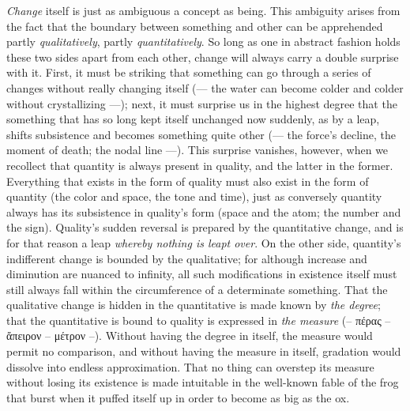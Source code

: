 \documentclass[12pt]{book}
\begin{document}
\emph{Change} itself is just as ambiguous a concept as being. This ambiguity
arises from the fact that the boundary between something and other can be
apprehended partly \emph{qualitatively}, partly \emph{quantitatively}. So
long as one in abstract fashion holds these two sides apart from each other,
change will always carry a double surprise with it. First, it must be
striking that something can go through a series of changes without really
changing itself (--- the water can become colder and colder without
crystallizing ---); next, it must surprise us in the highest degree that the
something that has so long kept itself unchanged now suddenly, as by a leap,
shifts subsistence and becomes something quite other (--- the force's
decline, the moment of death; the nodal line ---). This surprise vanishes,
however, when we recollect that quantity is always present in quality, and
the latter in the former. Everything that exists in the form of quality must
also exist in the form of quantity (the color and space, the tone and time),
just as conversely quantity always has its subsistence in quality's form
(space and the atom; the number and the sign). Quality's sudden reversal is
prepared by the quantitative change, and is for that reason a leap
\emph{whereby nothing is leapt over}. On the other side, quantity's
indifferent change is bounded by the qualitative; for although increase and
diminution are nuanced to infinity, all such modifications in existence
itself must still always fall within the circumference of a determinate
something. That the qualitative change is hidden in the quantitative is made
known by \emph{the degree}; that the quantitative is bound to quality is
expressed in \emph{the measure} (-- πέρας -- ἄπειρον -- μέτρον --). Without
having the degree in itself, the measure would permit no comparison, and
without having the measure in itself, gradation would dissolve into endless
approximation. That no thing can overstep its measure without losing its
existence is made intuitable in the well-known fable of the frog that burst
when it puffed itself up in order to become as big as the ox.
\end{document}
